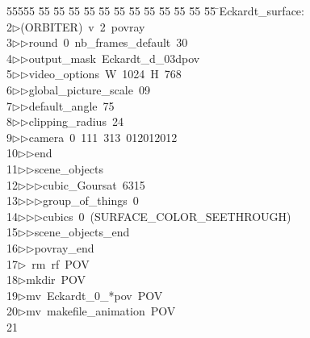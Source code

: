 %
%
\begin{tabbing}
55555 \= 55 \= 55 \= 55 \= 55 \= 55 \= 55 \= 55 \= 55 \= 55 \= 55 \= 55 \= 55 \= \>Eckardt\_surface:\\[0pt]
2\>$\triangleright$\>(ORBITER)\ v\ 2\ povray\ \\[0pt]
3\>$\triangleright$\>$\triangleright$\>round\ 0\ nb\_frames\_default\ 30\ \\[0pt]
4\>$\triangleright$\>$\triangleright$\>output\_mask\ Eckardt\_d\_03dpov\ \\[0pt]
5\>$\triangleright$\>$\triangleright$\>video\_options\ W\ 1024\ H\ 768\ \\[0pt]
6\>$\triangleright$\>$\triangleright$\>global\_picture\_scale\ 09\ \\[0pt]
7\>$\triangleright$\>$\triangleright$\>default\_angle\ 75\ \\[0pt]
8\>$\triangleright$\>$\triangleright$\>clipping\_radius\ 24\ \\[0pt]
9\>$\triangleright$\>$\triangleright$\>camera\ 0\ 111\ 313\ 012012012\ \\[0pt]
10\>$\triangleright$\>$\triangleright$\>end\ \\[0pt]
11\>$\triangleright$\>$\triangleright$\>scene\_objects\ \\[0pt]
12\>$\triangleright$\>$\triangleright$\>$\triangleright$\>cubic\_Goursat\ 6315\ \\[0pt]
13\>$\triangleright$\>$\triangleright$\>$\triangleright$\>group\_of\_things\ 0\ \\[0pt]
14\>$\triangleright$\>$\triangleright$\>$\triangleright$\>cubics\ 0\ (SURFACE\_COLOR\_SEETHROUGH)\ \\[0pt]
15\>$\triangleright$\>$\triangleright$\>scene\_objects\_end\ \\[0pt]
16\>$\triangleright$\>$\triangleright$\>povray\_end\\[0pt]
17\>$\triangleright$\>\ rm\ rf\ POV\\[0pt]
18\>$\triangleright$\>mkdir\ POV\\[0pt]
19\>$\triangleright$\>mv\ Eckardt\_0\_*pov\ POV\\[0pt]
20\>$\triangleright$\>mv\ makefile\_animation\ POV\\[0pt]
21\>\end{tabbing}
